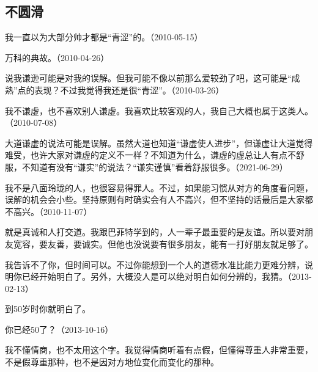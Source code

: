 \subsection{不圆滑}


我一直以为大部分帅才都是“青涩”的。（2010-05-15）


万科的典故。（2010-04-26）


说我谦逊可能是对我的误解。但我可能不像以前那么爱较劲了吧，这可能是“成熟”点的表现？不过我觉得我还是很“青涩”。（2010-03-26）

我不谦虚，也不喜欢别人谦虚。我喜欢比较客观的人，我自己大概也属于这类人。（2010-07-08）

大道谦虚的说法可能是误解。虽然大道也知道“谦虚使人进步”，但谦虚让大道觉得难受，也许大家对谦虚的定义不一样？不知道为什么，谦虚的虚总让人有点不舒服，不知道有没有“谦实”的说法？“谦实谨慎”看着舒服很多。（2021-06-29）


我不是八面玲珑的人，也很容易得罪人。不过，如果能习惯从对方的角度看问题，误解的机会会小些。坚持原则有时确实会有人不高兴，但不坚持的话最后是大家都不高兴。（2010-11-07）


就是真诚和人打交道。我跟巴菲特学到的，人一辈子最重要的是友谊。所以要对朋友宽容，要友善，要诚实。但他也没说要有很多朋友，能有一打好朋友就足够了。


我告诉不了你，但时间可以。不过你能想到一个人的道德水准比能力更难分辨，说明你已经开始明白了。另外，大概没人是可以绝对明白如何分辨的，我猜。（2013-02-13）


到50岁时你就明白了。


你已经50了？（2013-10-16）


我不懂情商，也不太用这个字。我觉得情商听着有点假，但懂得尊重人非常重要，不是假尊重那种，也不是因对方地位变化而变化的那种。

